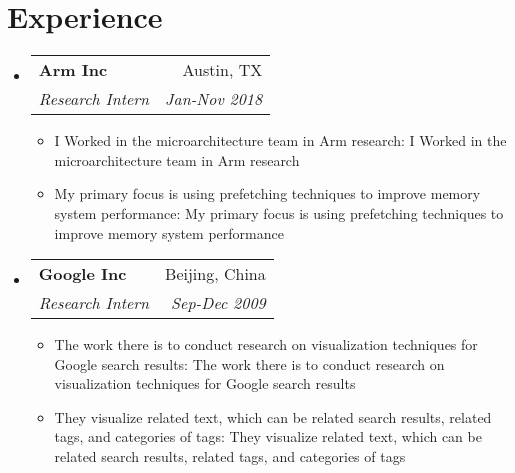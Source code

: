 \documentclass[letterpaper,10pt]{article}
\makeatletter
\def \ifempty#1{\def\temp{#1} \ifx\temp\empty }
\newcommand{\resumeItem}[2]{
  \item\small{
  	\ifempty{#1}#2\else\textbf{#1}{: #2 \vspace{-2pt}}\fi
  }
}
\newcommand{\resumeSubheading}[4]{
  \vspace{-1pt}\item
    \begin{tabular*}{0.97\textwidth}{l@{\extracolsep{\fill}}r}
      \textbf{#1} & #2 \\
      \textit{\small#3} & \textit{\small #4} \\
    \end{tabular*}\vspace{-5pt}
}
\newcommand{\resumeSubHeadingListStart}{\begin{itemize}[leftmargin=*]}
\newcommand{\resumeSubHeadingListEnd}{\end{itemize}}
\newcommand{\resumeItemListStart}{\begin{itemize}}
\newcommand{\resumeItemListEnd}{\end{itemize}\vspace{-5pt}}
\makeatother
\begin{document}
\section{Experience}
  \resumeSubHeadingListStart
    \resumeSubheading
      {Arm Inc}{Austin, TX}
      {Research Intern}{Jan-Nov 2018}
      \resumeItemListStart
      	\resumeItem{}
          {I Worked in the microarchitecture team in Arm research}
        \resumeItem{}
          {My primary
focus is using prefetching techniques to improve memory system performance}
      \resumeItemListEnd
        \resumeSubheading
      {Google Inc}{Beijing, China}
      {Research Intern}{Sep-Dec 2009}
      \resumeItemListStart
      	\resumeItem{}
          {The work there is to conduct research on visualization
techniques for Google search results}
        \resumeItem{}
        {They visualize related text, which can be related
    search results, related tags, and categories of tags}
      \resumeItemListEnd
  \resumeSubHeadingListEnd
\end{document}
